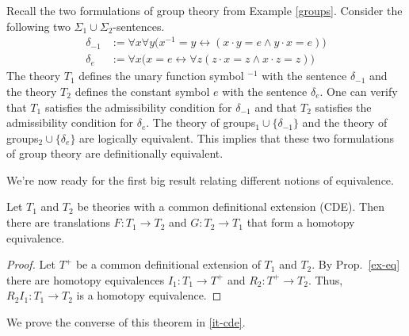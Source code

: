 \begin{example}
  Recall the two formulations of group theory from Example
  \ref{groups}.  Consider the following two
  $\Sigma_1\cup\Sigma_2$-sentences.
\begin{align*}
\delta_{-1}&:=\forall x\forall y\big(x^{-1}=y\leftrightarrow (x\cdot y=e\land y\cdot x=e)\big)\\
\delta_e&:=\forall x \big(x=e\leftrightarrow \forall z(z\cdot x=z\land x\cdot z=z)\big)
\end{align*}
The theory $T_1$ defines the unary function symbol $^{-1}$ with the
sentence $\delta_{-1}$ and the theory $T_2$ defines the constant
symbol $e$ with the sentence $\delta_e$. One can verify that $T_1$
satisfies the admissibility condition for $\delta_{-1}$ and that $T_2$
satisfies the admissibility condition for $\delta_e$. The theory of
groups$_1\cup\{\delta_{-1}\}$ and the theory of
groups$_2\cup\{\delta_e\}$ are logically equivalent. This implies that
these two formulations of group theory are definitionally equivalent.
\end{example}

We're now ready for the first big result relating different notions of
equivalence.

\begin{thm}[Barrett] Let $T_1$ and $T_2$ be theories with a common
  definitional extension (CDE).  Then there are translations
  $F:T_1\to T_2$ and $G:T_2\to T_1$ that form a homotopy
  equivalence. \label{cde-it}
\end{thm}

\begin{proof} Let $T^+$ be a common definitional extension of $T_1$
  and $T_2$.  By Prop.\ \ref{ex-eq} there are homotopy equivalences
  $I_1:T_1\to T^+$ and $R_2:T^+\to T_2$.  Thus, $R_2I_1:T_1\to T_2$ is
  a homotopy equivalence.
\end{proof}

We prove the converse of this theorem in \ref{it-cde}.






